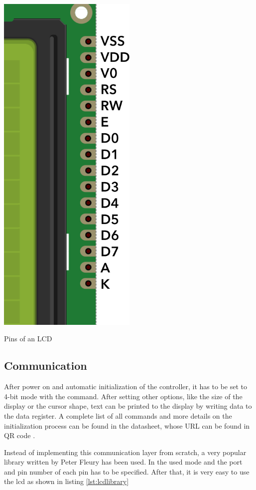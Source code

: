 \begin{marginfigure}[-5cm]
    \centering
    \includegraphics[width=0.5\textwidth]{felix/resources/lcd_pins.png}
    \caption{Pins of an LCD}
    \label{fig:lcd_pins}
\end{marginfigure}

\subsection{Communication}

After power on and automatic initialization of the controller, it has to be set to 4-bit mode with the  command. After setting other options, like the size of the display or the cursor shape, text can be printed to the display by writing data to the data register. A complete list of all commands and more details on the initialization process can be found in the datasheet, whose URL can be found in QR code .

Instead of implementing this communication layer from scratch, a very popular library written by Peter Fleury has been used. In  the used mode and the port and pin number of each pin has to be specified. After that, it is very easy to use the \gls{lcd} as shown in listing \ref{lst:lcdlibrary}

